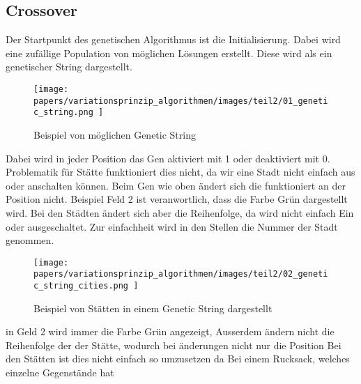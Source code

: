 %
%
%
%
\subsection{Crossover 
\label{genetic_algorithm:crossover }}
Der Startpunkt des genetischen Algorithmus ist die Initialisierung.
Dabei wird eine zufällige Population von möglichen Lösungen erstellt.
Diese wird als ein genetischer String dargestellt.

\begin{figure} [h]
	\centering
	\texttt{[image: 
        papers/variationsprinzip\_algorithmen/images/teil2/01\_genetic\_string.png
        ]}
	\caption{Beispiel von möglichen Genetic String}
	\label{fig:possible_genetic_string}
\end{figure}

Dabei wird in jeder Position das Gen aktiviert mit 1 oder deaktiviert mit 0.
Problematik für Stätte funktioniert dies nicht, da wir eine Stadt nicht
einfach aus oder anschalten können. Beim Gen wie oben ändert sich die funktioniert
an der Position nicht. Beispiel Feld 2 ist veranwortlich, dass die Farbe Grün
dargestellt wird. Bei den Städten ändert sich aber die Reihenfolge, da wird 
nicht einfach Ein oder ausgeschaltet. Zur einfachheit wird in den Stellen 
die Nummer der Stadt genommen.

\begin{figure} [h]
	\centering
	\texttt{[image: 
        papers/variationsprinzip\_algorithmen/images/teil2/02\_genetic\_string\_cities.png
        ]}
	\caption{Beispiel von Stätten in einem Genetic String dargestellt}
	\label{fig:cities_genetic_string}
\end{figure}


in Geld 2 wird immer die Farbe Grün angezeigt,  Ausserdem ändern nicht die Reihenfolge
der der Stätte, wodurch bei änderungen nicht nur die Position 
Bei den Stätten ist dies nicht einfach so umzusetzen da Bei einem Rucksack, welches einzelne Gegenstände hat 


